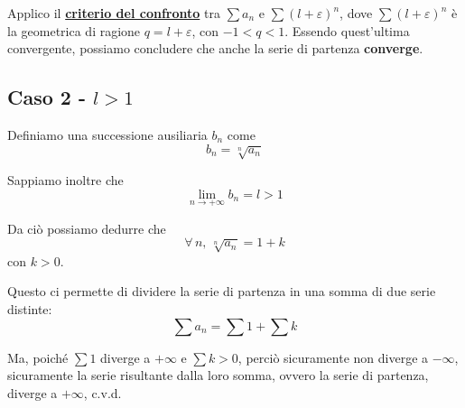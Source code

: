 \documentclass[../../dimostrazioni]{subfiles}
\begin{document}
                Applico il \textbf{\hyperref[serieconfronto]{criterio del confronto}} tra \(\sum a_n\) e \(\sum(l + \varepsilon)^n\),
                dove \(\sum(l + \varepsilon)^n\) è la geometrica di ragione \(q = l + \varepsilon\), con \(-1 < q < 1\).
                Essendo quest'ultima convergente, possiamo concludere che anche la serie di partenza \textbf{converge}.

            \subsection*{Caso 2 - \(l > 1\)}

                Definiamo una successione ausiliaria \(b_n\) come
                \[ b_n = \sqrt[n]{a_n} \]

                Sappiamo inoltre che
                \[ \lim_{n \to +\infty}b_n = l > 1 \]

                Da ciò possiamo dedurre che
                \[\forall \, n , \, \sqrt[n]{a_n} = 1 + k\]
                con \(k > 0\).

                Questo ci permette di dividere la serie di partenza in una somma di due serie distinte:
                \[\sum a_n = \sum 1 + \sum k\]

                Ma, poiché \(\sum 1\) diverge a \(+ \infty\) e \(\sum k > 0\), perciò sicuramente non diverge a \(- \infty\),
                sicuramente la serie risultante dalla loro somma, ovvero la serie di partenza, diverge a \(+ \infty\), c.v.d.
\end{document}
